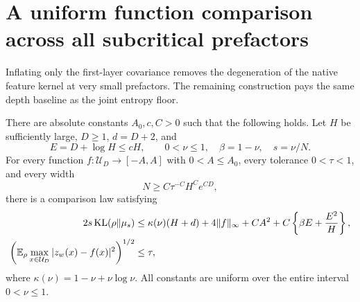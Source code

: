\section{A uniform function comparison across all subcritical prefactors}
\label{sec:all-prefactor-function-comparison}
Inflating only the first-layer covariance removes the degeneration of the native feature kernel at very small prefactors. The remaining construction pays the same depth baseline as the joint entropy floor.

\begin{theorem}
\label{thm:all-prefactor-function-comparison}
There are absolute constants $A_0,c,C>0$ such that the following holds. Let $H$ be sufficiently large, $D\ge1$, $d=D+2$, and
\[
 E=D+\log H\le cH,
 \qquad 0<\nu\le1,\quad \beta=1-\nu,\quad s=\nu/N.
\]
For every function $f:\mathcal U_D\to[-A,A]$ with $0<A\le A_0$, every tolerance $0<\tau<1$, and every width
\[
 N\ge C\tau^{-C}H^C e^{CD},
\]
there is a comparison law satisfying
\begin{align*}
 2s\operatorname{KL}(\rho\|\mu_s)
 &\le \kappa(\nu)(H+d)+4\|f\|_\infty+CA^2
           +C\left\{\beta E+\frac{E^2}{H}\right\},\\
 \left(\mathbb E_\rho\max_{x\in\mathcal U_D}|z_w(x)-f(x)|^2\right)^{1/2}
 &\le\tau,
\end{align*}
where $\kappa(\nu)=1-\nu+\nu\log\nu$. All constants are uniform over the entire interval $0<\nu\le1$.
\end{theorem}
